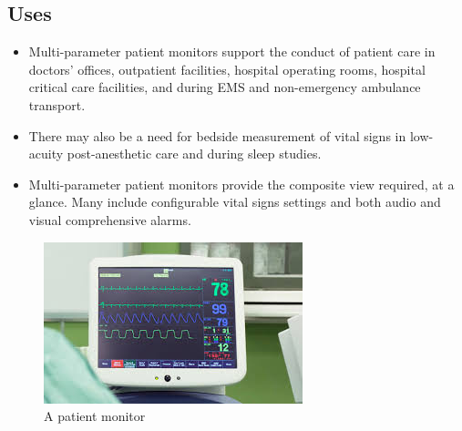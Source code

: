 \documentclass[12pt]{book}
\begin{document}
\subsection{Uses}
\begin{itemize}

\item Multi-parameter patient monitors support the conduct of patient care in doctors’ offices, outpatient facilities, hospital operating rooms, hospital critical care facilities, and during EMS and non-emergency ambulance transport.
\item There may also be a need for bedside measurement of vital signs in low-acuity post-anesthetic care and during sleep studies.


\item Multi-parameter patient monitors provide the composite view required, at a glance. Many include configurable vital signs settings and both audio and visual comprehensive alarms.

\end{itemize}
\begin{figure}
    \centering
    \includegraphics[width=0.6\linewidth]{patientmonitor.jpeg}
    \caption{A patient monitor}%
    \label{fig:}
\end{figure}
\end{document}
